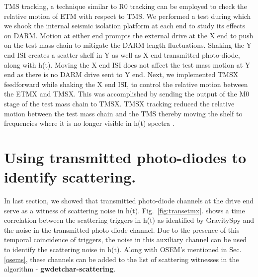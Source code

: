 \documentclass[12pt]{iopart}
\begin{document}
TMS tracking, a technique similar to R0 tracking can be employed to check the relative motion of ETM with respect to TMS. We performed a test during which we shook the internal seismic isolation platform at each end to study its effects on DARM. Motion at either end prompts the external drive at the X end to push on the test mass chain to mitigate the DARM length fluctuations. Shaking the Y end ISI creates a scatter shelf in Y as well as X end transmitted photo-diode, along with h(t). Moving the X end ISI does not affect the test mass motion at Y end as there is no DARM drive sent to Y end.
Next, we implemented TMSX feedforward while shaking the X end ISI, to control the relative motion between the ETMX and TMSX. This was accomplished by sending the output of the M0 stage of the test mass chain to TMSX. TMSX tracking reduced the relative motion between the test mass chain and the TMS thereby moving the shelf to frequencies where it is no longer visible in h(t) spectra \cite{alogae_tmsx,alogsid_tmsx}. 

 
\section{Using transmitted photo-diodes to identify scattering.}\label{transmonwitness}
In last section, we showed that transmitted photo-diode channels at the drive end serve as a witness of scattering noise in h(t). Fig.~\ref{fig:transetmx}. shows a time correlation between the scattering triggers in h(t) as identified by GravitySpy and the noise in the transmitted photo-diode channel. Due to the presence of this temporal coincidence of triggers, the noise in this auxiliary channel can be used to identify the scattering noise in h(t). Along with OSEM’s mentioned in Sec. \ref{osems}, these channels can be added to the list of scattering witnesses in the algorithm - \textbf{gwdetchar-scattering}.
\end{document}
